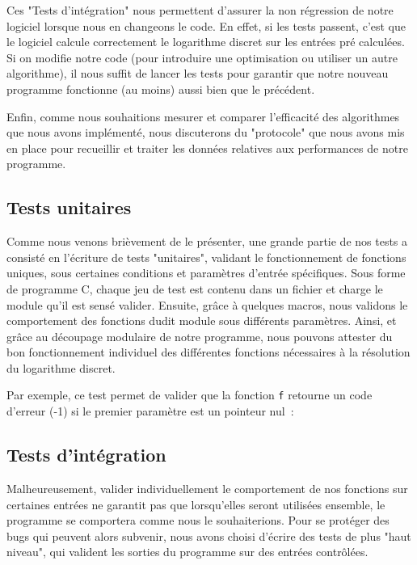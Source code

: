       Ces "Tests d'intégration" nous permettent d'assurer la non régression de notre logiciel lorsque nous en changeons le code. En effet, si les tests passent, c'est que le logiciel calcule correctement le logarithme discret sur les entrées pré calculées. Si on modifie notre code (pour introduire une optimisation ou utiliser un autre algorithme), il nous suffit de lancer les tests pour garantir que notre nouveau programme fonctionne (au moins) aussi bien que le précédent.

      Enfin, comme nous souhaitions mesurer et comparer l'efficacité des algorithmes que nous avons implémenté, nous discuterons du "protocole" que nous avons mis en place pour recueillir et traiter les données relatives aux performances de notre programme.


      \subsection{Tests unitaires}
      Comme nous venons brièvement de le présenter, une grande partie de nos tests a consisté en l'écriture de tests "unitaires", validant le fonctionnement de fonctions uniques, sous certaines conditions et paramètres d'entrée spécifiques.
      Sous forme de programme C, chaque jeu de test est contenu dans un fichier et charge le module qu'il est sensé valider. Ensuite, grâce à quelques macros, nous validons le comportement des fonctions dudit module sous différents paramètres.
      Ainsi, et grâce au découpage modulaire de notre programme, nous pouvons attester du bon fonctionnement individuel des différentes fonctions nécessaires à la résolution du logarithme discret.

      Par exemple, ce test permet de valider que la fonction \lstinline{f} retourne un code d'erreur (-1) si le premier paramètre est un pointeur nul~:

      


      \subsection{Tests d'intégration}
      Malheureusement, valider individuellement le comportement de nos fonctions sur certaines entrées ne garantit pas que lorsqu'elles seront utilisées ensemble, le programme se comportera comme nous le souhaiterions.
      Pour se protéger des bugs qui peuvent alors subvenir, nous avons choisi d'écrire des tests de plus "haut niveau", qui valident les sorties du programme sur des entrées contrôlées.

